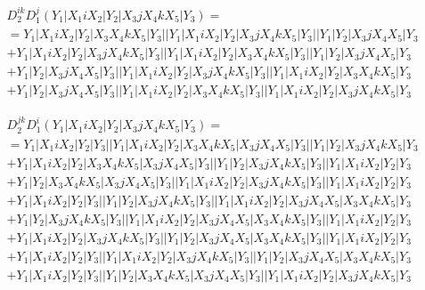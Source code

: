 \documentclass{article}[12pt]
\begin{document}
\begin{align*}
& D_2^{ik}D_1^j(Y_1|X_1iX_2|Y_2|X_3jX_4kX_5|Y_3) =\\
& =Y_1|X_1iX_2|Y_2|X_3X_4kX_5|Y_3||Y_1|X_1iX_2|Y_2|X_3jX_4kX_5|Y_3||Y_1|Y_2|X_3jX_4X_5|Y_3\\ 
 & +Y_1|X_1iX_2|Y_2|X_3jX_4kX_5|Y_3||Y_1|X_1iX_2|Y_2|X_3X_4kX_5|Y_3||Y_1|Y_2|X_3jX_4X_5|Y_3\\ 
 & +Y_1|Y_2|X_3jX_4X_5|Y_3||Y_1|X_1iX_2|Y_2|X_3jX_4kX_5|Y_3||Y_1|X_1iX_2|Y_2|X_3X_4kX_5|Y_3\\ 
 & +Y_1|Y_2|X_3jX_4X_5|Y_3||Y_1|X_1iX_2|Y_2|X_3X_4kX_5|Y_3||Y_1|X_1iX_2|Y_2|X_3jX_4kX_5|Y_3\end{align*}

\begin{align*}
& D_2^{jk}D_1^i(Y_1|X_1iX_2|Y_2|X_3jX_4kX_5|Y_3) =\\
& =Y_1|X_1iX_2|Y_2|Y_3||Y_1|X_1iX_2|Y_2|X_3X_4kX_5|X_3jX_4X_5|Y_3||Y_1|Y_2|X_3jX_4kX_5|Y_3\\ 
 & +Y_1|X_1iX_2|Y_2|X_3X_4kX_5|X_3jX_4X_5|Y_3||Y_1|Y_2|X_3jX_4kX_5|Y_3||Y_1|X_1iX_2|Y_2|Y_3\\ 
 & +Y_1|Y_2|X_3X_4kX_5|X_3jX_4X_5|Y_3||Y_1|X_1iX_2|Y_2|X_3jX_4kX_5|Y_3||Y_1|X_1iX_2|Y_2|Y_3\\ 
 & +Y_1|X_1iX_2|Y_2|Y_3||Y_1|Y_2|X_3jX_4kX_5|Y_3||Y_1|X_1iX_2|Y_2|X_3jX_4X_5|X_3X_4kX_5|Y_3\\ 
 & +Y_1|Y_2|X_3jX_4kX_5|Y_3||Y_1|X_1iX_2|Y_2|X_3jX_4X_5|X_3X_4kX_5|Y_3||Y_1|X_1iX_2|Y_2|Y_3\\ 
 & +Y_1|X_1iX_2|Y_2|X_3jX_4kX_5|Y_3||Y_1|Y_2|X_3jX_4X_5|X_3X_4kX_5|Y_3||Y_1|X_1iX_2|Y_2|Y_3\\ 
 & +Y_1|X_1iX_2|Y_2|Y_3||Y_1|X_1iX_2|Y_2|X_3jX_4kX_5|Y_3||Y_1|Y_2|X_3jX_4X_5|X_3X_4kX_5|Y_3\\ 
 & +Y_1|X_1iX_2|Y_2|Y_3||Y_1|Y_2|X_3X_4kX_5|X_3jX_4X_5|Y_3||Y_1|X_1iX_2|Y_2|X_3jX_4kX_5|Y_3\end{align*}
\end{document}
